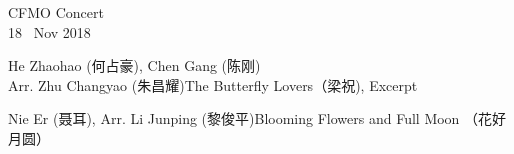 \documentclass[letter,6pt,poets]{ConcProg}
\begin{document}
\pagestyle{empty}
\begin{spacing}{1.1} %

\begin{programme}{
    CFMO Concert
\\  {\normalsize 18 ~Nov 2018}
}
  \begin{part}[]
    \begin{composition}{He Zhaohao (何占豪), Chen Gang (陈刚) \\Arr. Zhu Changyao (朱昌耀)}{}{The Butterfly Lovers（梁祝), Excerpt}{}
    \end{composition}
    
    \begin{composition}{Nie Er (聂耳), Arr. Li Junping (黎俊平)}{}{Blooming Flowers and Full Moon （花好月圆）}{}      
    \end{composition}
    

\end{part}
\end{programme}
\end{spacing}
\end{document}
